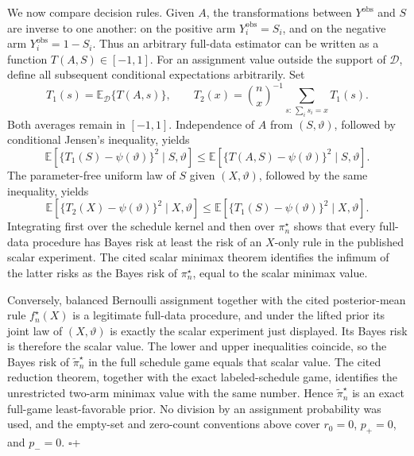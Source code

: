 We now compare decision rules. Given \(A\), the transformations between \(Y^{\mathrm{obs}}\) and \(S\) are inverse to one another: on the positive arm \(Y_i^{\mathrm{obs}}=S_i\), and on the negative arm \(Y_i^{\mathrm{obs}}=1-S_i\). Thus an arbitrary full-data estimator can be written as a function \(T(A,S)\in[-1,1]\). For an assignment value outside the support of \(\mathcal D\), define all subsequent conditional expectations arbitrarily. Set
\[
 T_1(s)=\mathbb E_{\mathcal D}\{T(A,s)\},
 \qquad
 T_2(x)=\binom nx^{-1}
 \sum_{s:\,\sum_i s_i=x}T_1(s).
\]
Both averages remain in \([-1,1]\). Independence of \(A\) from \((S,\vartheta)\), followed by conditional Jensen's inequality, yields
\[
 \mathbb E\!\left[\{T_1(S)-\psi(\vartheta)\}^2
 \mid S,\vartheta\right]
 \leq
 \mathbb E\!\left[\{T(A,S)-\psi(\vartheta)\}^2
 \mid S,\vartheta\right].
\]
The parameter-free uniform law of \(S\) given \((X,\vartheta)\), followed by the same inequality, yields
\[
 \mathbb E\!\left[\{T_2(X)-\psi(\vartheta)\}^2
 \mid X,\vartheta\right]
 \leq
 \mathbb E\!\left[\{T_1(S)-\psi(\vartheta)\}^2
 \mid X,\vartheta\right].
\]
Integrating first over the schedule kernel and then over \(\pi_n^\star\) shows that every full-data procedure has Bayes risk at least the risk of an \(X\)-only rule in the published scalar experiment. The cited scalar minimax theorem identifies the infimum of the latter risks as the Bayes risk of \(\pi_n^\star\), equal to the scalar minimax value.

Conversely, balanced Bernoulli assignment together with the cited posterior-mean rule \(f_n^\star(X)\) is a legitimate full-data procedure, and under the lifted prior its joint law of \((X,\vartheta)\) is exactly the scalar experiment just displayed. Its Bayes risk is therefore the scalar value. The lower and upper inequalities coincide, so the Bayes risk of \(\widetilde\pi_n^\star\) in the full schedule game equals that scalar value. The cited reduction theorem, together with the exact labeled-schedule game, identifies the unrestricted two-arm minimax value with the same number. Hence \(\widetilde\pi_n^\star\) is an exact full-game least-favorable prior. No division by an assignment probability was used, and the empty-set and zero-count conventions above cover \(r_0=0\), \(p_+=0\), and \(p_-=0\). \(\square\)+